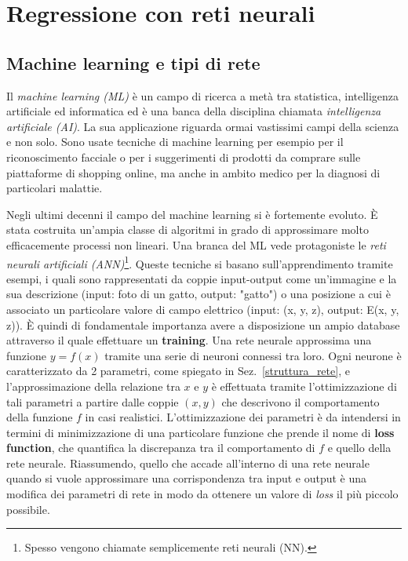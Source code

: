 \documentclass[12pt,a4paper,final]{book}
\begin{document}



\chapter{Regressione con reti neurali}\label{reg_nn}


\section{Machine learning e tipi di rete}
Il \textit{machine learning (ML)} è un campo di ricerca a metà tra statistica, intelligenza artificiale ed informatica ed è una banca della disciplina chiamata \textit{intelligenza artificiale (AI)}. La sua applicazione riguarda ormai vastissimi campi della scienza e non solo. Sono usate tecniche di machine learning per esempio per il riconoscimento facciale o per i suggerimenti di prodotti da comprare sulle piattaforme di shopping online, ma anche in ambito medico per la diagnosi di particolari malattie.


Negli ultimi decenni il campo del machine learning si è fortemente evoluto. È stata costruita un'ampia classe di algoritmi in grado di approssimare molto efficacemente processi non lineari. Una branca del ML vede protagoniste le \textit{reti neurali artificiali (ANN)}\footnote{Spesso vengono chiamate semplicemente reti neurali (NN).}.
Queste tecniche si basano sull'apprendimento tramite esempi, i quali sono rappresentati da coppie input-output come un'immagine e la sua descrizione (input: foto di un gatto, output: "gatto") o una posizione a cui è associato un particolare valore di campo elettrico (input: (x, y, z), output: E(x, y, z)). È quindi di fondamentale importanza avere a disposizione un ampio database attraverso il quale effettuare un \textbf{training}.
Una rete neurale approssima una funzione $y=f(x)$ tramite una serie di neuroni connessi tra loro. Ogni neurone è caratterizzato da 2 parametri, come spiegato in Sez.~\ref{struttura_rete}, e l'approssimazione della relazione tra $x$ e $y$ è effettuata tramite l'ottimizzazione di tali parametri a partire dalle coppie $(x, y)$ che descrivono il comportamento della funzione $f$ in casi realistici. L'ottimizzazione dei parametri è da intendersi in termini di minimizzazione di una particolare funzione che prende il nome di \textbf{loss function}, che quantifica la discrepanza tra il comportamento di $f$ e quello della rete neurale. Riassumendo, quello che accade all'interno di una rete neurale quando si vuole approssimare una corrispondenza tra input e output è una modifica dei parametri di rete in modo da ottenere un valore di \textit{loss} il più piccolo possibile. 
\end{document}

